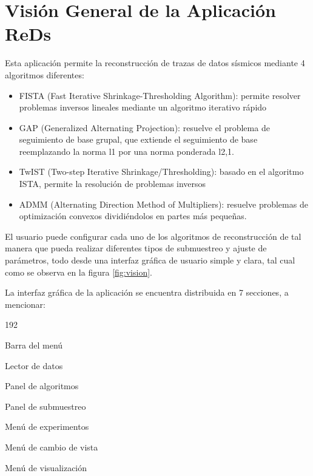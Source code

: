 \documentclass[12pt,twoside,letter]{ol-softwaremanual}
\begin{document}
\newpage\null\thispagestyle{empty}\newpage

\clearpage
\tableofcontents

\clearpage

\newpage\null\thispagestyle{empty}\newpage

\section{Visión General de la Aplicación ReDs}

Esta aplicación permite la reconstrucción de trazas de datos sísmicos mediante 4 algoritmos diferentes:
\begin{itemize}[leftmargin=0.5in]
	\setlength\itemsep{0em}
	\item FISTA (Fast Iterative Shrinkage-Thresholding Algorithm): permite resolver problemas inversos lineales mediante un algoritmo iterativo rápido
	\item GAP (Generalized Alternating Projection): resuelve el problema de seguimiento de base grupal, que extiende el seguimiento de base reemplazando la norma l1 por una norma ponderada l2,1.
	\item TwIST (Two-step Iterative Shrinkage/Thresholding): basado en el algoritmo ISTA, permite la resolución de problemas inversos
	\item ADMM (Alternating Direction Method of Multipliers): resuelve problemas de optimización convexos dividiéndolos en partes más pequeñas.
\end{itemize}
El usuario puede configurar cada uno de los algoritmos de reconstrucción de tal manera que pueda realizar diferentes tipos de submuestreo y ajuste de parámetros, todo desde una interfaz gráfica de usuario simple y clara, tal cual como se observa en la figura \ref{fig:vision}.

La interfaz gráfica de la aplicación se encuentra distribuida en 7 secciones, a mencionar: 
\begin{dingautolist}{192}
	\setlength\itemsep{0em}
	\item Barra del menú
	\item Lector de datos
	\item Panel de algoritmos
	\item Panel de submuestreo
	\item Menú de experimentos
	\item Menú de cambio de vista
	\item Menú de visualización
\end{dingautolist}
\end{document}
